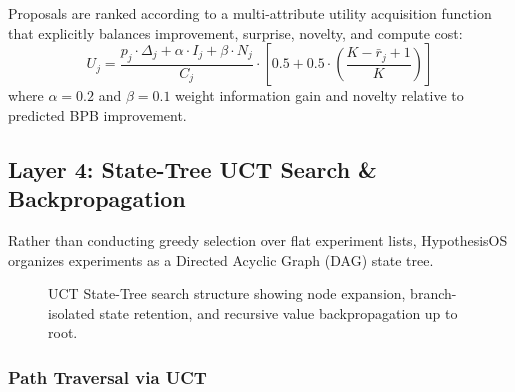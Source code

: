 \documentclass[10pt,twocolumn,3p,times]{article}
\begin{document}
Proposals are ranked according to a multi-attribute utility acquisition function that explicitly balances improvement, surprise, novelty, and compute cost:
\begin{equation}
    U_j = \frac{p_j \cdot \Delta_j + \alpha \cdot I_j + \beta \cdot N_j}{C_j} \cdot \left[ 0.5 + 0.5 \cdot \left( \frac{K - \bar{r}_j + 1}{K} \right) \right]
    \label{eq:ev_acquisition}
\end{equation}
where $\alpha = 0.2$ and $\beta = 0.1$ weight information gain and novelty relative to predicted BPB improvement.

\subsection{Layer 4: State-Tree UCT Search \& Backpropagation}

Rather than conducting greedy selection over flat experiment lists, HypothesisOS organizes experiments as a Directed Acyclic Graph (DAG) state tree.

\begin{figure}[h]
\centering
{}
\caption{UCT State-Tree search structure showing node expansion, branch-isolated state retention, and recursive value backpropagation up to root.}
\label{fig:tikz_uct_tree}
\end{figure}

\subsubsection{Path Traversal via UCT}
\end{document}
